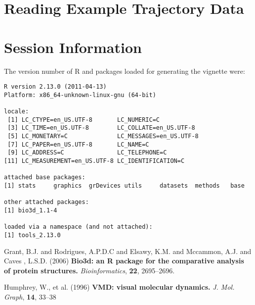 \documentclass[letter]{article}
\begin{document}
\section{Reading Example Trajectory Data}


\section{Session Information}
The version number of R and packages loaded for generating the vignette were:

\begin{verbatim}
R version 2.13.0 (2011-04-13)
Platform: x86_64-unknown-linux-gnu (64-bit)

locale:
 [1] LC_CTYPE=en_US.UTF-8       LC_NUMERIC=C              
 [3] LC_TIME=en_US.UTF-8        LC_COLLATE=en_US.UTF-8    
 [5] LC_MONETARY=C              LC_MESSAGES=en_US.UTF-8   
 [7] LC_PAPER=en_US.UTF-8       LC_NAME=C                 
 [9] LC_ADDRESS=C               LC_TELEPHONE=C            
[11] LC_MEASUREMENT=en_US.UTF-8 LC_IDENTIFICATION=C       

attached base packages:
[1] stats     graphics  grDevices utils     datasets  methods   base     

other attached packages:
[1] bio3d_1.1-4

loaded via a namespace (and not attached):
[1] tools_2.13.0\end{verbatim}

\begin{thebibliography}{9}


Grant, B.J. and Rodrigues, A.P.D.C and Elsawy, K.M. and Mccammon, A.J. and Caves
, L.S.D. (2006)
\textbf{Bio3d: an R package for the comparative analysis of protein structures.}
\emph{Bioinformatics},
\textbf{22}, 2695--2696.


Humphrey, W., et al. (1996)
\textbf{VMD: visual molecular dynamics.}
\emph{J. Mol. Graph}, \textbf{14}, 33--38


\end{thebibliography}
\end{document}

